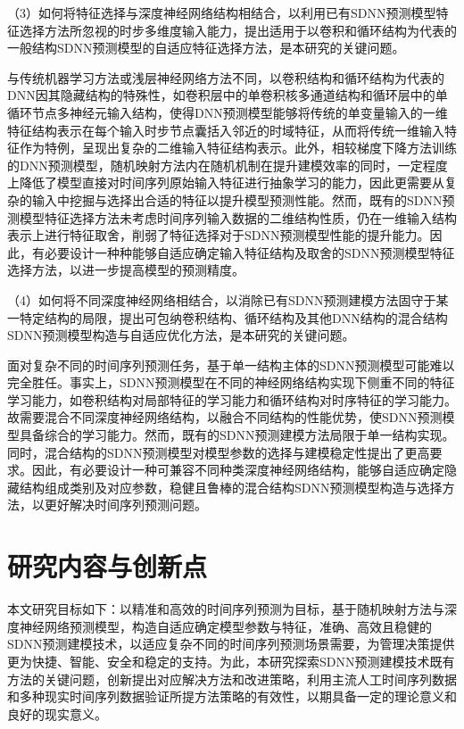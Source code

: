（3）如何将特征选择与深度神经网络结构相结合，以利用已有SDNN预测模型特征选择方法所忽视的时步多维度输入能力，提出适用于以卷积和循环结构为代表的一般结构SDNN预测模型的自适应特征选择方法，是本研究的关键问题。

与传统机器学习方法或浅层神经网络方法不同，以卷积结构和循环结构为代表的DNN因其隐藏结构的特殊性，如卷积层中的单卷积核多通道结构和循环层中的单循环节点多神经元输入结构，使得DNN预测模型能够将传统的单变量输入的一维特征结构表示在每个输入时步节点囊括入邻近的时域特征，从而将传统一维输入特征作为特例，呈现出复杂的二维输入特征结构表示。此外，相较梯度下降方法训练的DNN预测模型，随机映射方法内在随机机制在提升建模效率的同时，一定程度上降低了模型直接对时间序列原始输入特征进行抽象学习的能力，因此更需要从复杂的输入中挖掘与选择出合适的特征以提升模型预测性能。然而，既有的SDNN预测模型特征选择方法未考虑时间序列输入数据的二维结构性质，仍在一维输入结构表示上进行特征取舍，削弱了特征选择对于SDNN预测模型性能的提升能力。因此，有必要设计一种种能够自适应确定输入特征结构及取舍的SDNN预测模型特征选择方法，以进一步提高模型的预测精度。

（4）如何将不同深度神经网络相结合，以消除已有SDNN预测建模方法固守于某一特定结构的局限，提出可包纳卷积结构、循环结构及其他DNN结构的混合结构SDNN预测模型构造与自适应优化方法，是本研究的关键问题。

面对复杂不同的时间序列预测任务，基于单一结构主体的SDNN预测模型可能难以完全胜任。事实上，SDNN预测模型在不同的神经网络结构实现下侧重不同的特征学习能力，如卷积结构对局部特征的学习能力和循环结构对时序特征的学习能力。故需要混合不同深度神经网络结构，以融合不同结构的性能优势，使SDNN预测模型具备综合的学习能力。然而，既有的SDNN预测建模方法局限于单一结构实现。同时，混合结构的SDNN预测模型对模型参数的选择与建模稳定性提出了更高要求。因此，有必要设计一种可兼容不同种类深度神经网络结构，能够自适应确定隐藏结构组成类别及对应参数，稳健且鲁棒的混合结构SDNN预测模型构造与选择方法，以更好解决时间序列预测问题。

\section{研究内容与创新点}
本文研究目标如下：以精准和高效的时间序列预测为目标，基于随机映射方法与深度神经网络预测模型，构造自适应确定模型参数与特征，准确、高效且稳健的SDNN预测建模技术，以适应复杂不同的时间序列预测场景需要，为管理决策提供更为快捷、智能、安全和稳定的支持。为此，本研究探索SDNN预测建模技术既有方法的关键问题，创新提出对应解决方法和改进策略，利用主流人工时间序列数据和多种现实时间序列数据验证所提方法策略的有效性，以期具备一定的理论意义和良好的现实意义。

